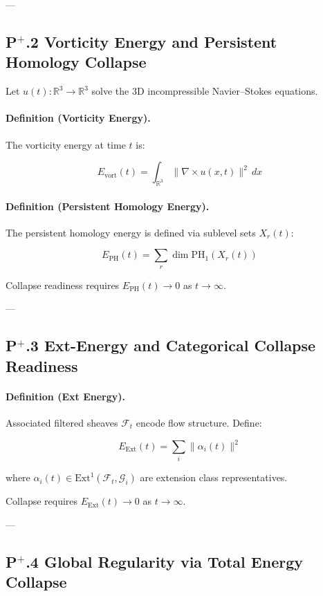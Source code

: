 \documentclass[11pt]{article}
\begin{document}
---

\subsection*{P$^{+}$.2 Vorticity Energy and Persistent Homology Collapse}

Let $u(t) : \mathbb{R}^3 \to \mathbb{R}^3$ solve the 3D incompressible Navier–Stokes equations.

\paragraph{Definition (Vorticity Energy).}

The vorticity energy at time $t$ is:

\[
E_{\mathrm{vort}}(t) = \int_{\mathbb{R}^3} \| \nabla \times u(x,t) \|^2 \, dx
\]

\paragraph{Definition (Persistent Homology Energy).}

The persistent homology energy is defined via sublevel sets $X_r(t)$:

\[
E_{\mathrm{PH}}(t) = \sum_{r} \dim \mathrm{PH}_1(X_r(t))
\]

Collapse readiness requires $E_{\mathrm{PH}}(t) \to 0$ as $t \to \infty$.

---

\subsection*{P$^{+}$.3 Ext-Energy and Categorical Collapse Readiness}

\paragraph{Definition (Ext Energy).}

Associated filtered sheaves $\mathcal{F}_t$ encode flow structure. Define:

\[
E_{\mathrm{Ext}}(t) = \sum_{i} \| \alpha_i(t) \|^2
\]

where $\alpha_i(t) \in \mathrm{Ext}^1(\mathcal{F}_t, \mathcal{G}_i)$ are extension class representatives.

Collapse requires $E_{\mathrm{Ext}}(t) \to 0$ as $t \to \infty$.

---

\subsection*{P$^{+}$.4 Global Regularity via Total Energy Collapse}
\end{document}
